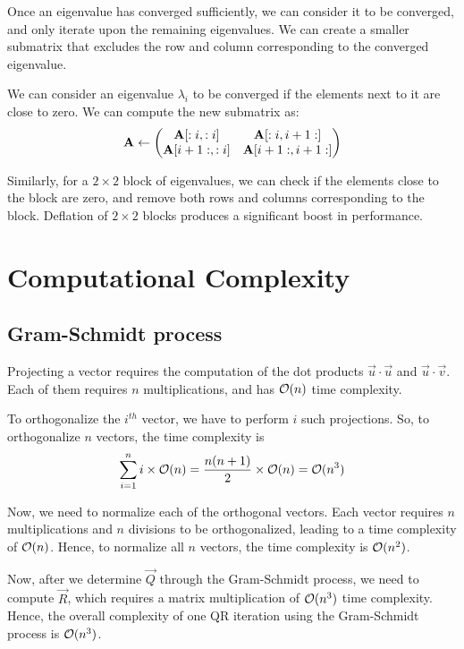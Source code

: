\documentclass{article}
\begin{document}
Once an eigenvalue has converged sufficiently, we can consider it to be converged,
and only iterate upon the remaining eigenvalues. We can create a smaller submatrix that excludes
the row and column corresponding to the converged eigenvalue.

We can consider an eigenvalue $\lambda_i$ to be converged if the elements next to it are close
to zero. We can compute the new submatrix as:
\begin{align}
    \mathbf{A} \gets \begin{pmatrix}\mathbf{A}[:i, :i] & \mathbf{A}[:i, i+1:] \\ \mathbf{A}[i+1:, :i] & \mathbf{A}[i+1:, i+1:]\end{pmatrix}
\end{align}

Similarly, for a $2 \times 2$ block of eigenvalues, we can check if the elements close
to the block are zero, and remove both rows and columns corresponding to the block. Deflation of
$2 \times 2$ blocks produces a significant boost in performance.

\section{Computational Complexity}

\subsection{Gram-Schmidt process}

Projecting a vector requires the computation of the
dot products $\vec{u} \cdot \vec{u}$ and $\vec{u} \cdot \vec{v}$. Each
of them requires $n$ multiplications, and has $\mathcal{O}(n)$ time complexity.

To orthogonalize the $i^{th}$ vector, we have to perform $i$ such projections.
So, to orthogonalize $n$ vectors, the time complexity is
\begin{align}
    \sum_{i=1}^n i \times \mathcal{O}(n) = \frac{n(n+1)}{2} \times \mathcal{O}(n) = \mathcal{O}(n^3)
\end{align}

Now, we need to normalize each of the orthogonal vectors. Each vector requires
$n$ multiplications and $n$ divisions to be orthogonalized, leading to a 
time complexity of $\mathcal{O}(n)$. Hence, to normalize all $n$ vectors, the time
complexity is $\mathcal{O}(n^2)$.

Now, after we determine $\vec{Q}$ through the Gram-Schmidt process, we need
to compute $\vec{R}$, which requires a matrix multiplication of $\mathcal{O}(n^3)$ time complexity.
Hence, the overall complexity of one QR iteration using the Gram-Schmidt process
is $\mathcal{O}(n^3)$.
\end{document}
